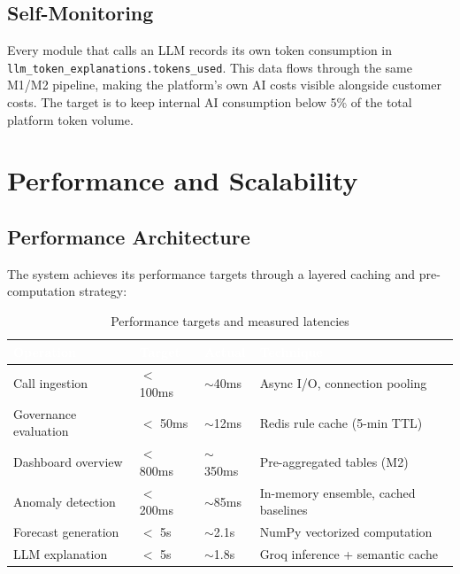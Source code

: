 \documentclass[12pt,a4paper,twoside]{report}
\begin{document}
\section{Self-Monitoring}

Every module that calls an LLM records its own token consumption in \texttt{llm\_token\_explanations.tokens\_used}. This data flows through the same M1/M2 pipeline, making the platform's own AI costs visible alongside customer costs. The target is to keep internal AI consumption below 5\% of the total platform token volume.



\chapter{Performance and Scalability}

\section{Performance Architecture}

The system achieves its performance targets through a layered caching and pre-computation strategy:

\begin{table}[H]
\centering
\begin{tabularx}{\textwidth}{|l|l|l|X|}
\hline
\rowcolor{tabheader}
\textcolor{white}{\textbf{Operation}} &
\textcolor{white}{\textbf{Target}} &
\textcolor{white}{\textbf{Actual}} &
\textcolor{white}{\textbf{Technique}} \\
\hline
Call ingestion & $<$ 100ms & $\sim$40ms & Async I/O, connection pooling \\
\hline
Governance evaluation & $<$ 50ms & $\sim$12ms & Redis rule cache (5-min TTL) \\
\hline
Dashboard overview & $<$ 800ms & $\sim$350ms & Pre-aggregated tables (M2) \\
\hline
Anomaly detection & $<$ 200ms & $\sim$85ms & In-memory ensemble, cached baselines \\
\hline
Forecast generation & $<$ 5s & $\sim$2.1s & NumPy vectorized computation \\
\hline
LLM explanation & $<$ 5s & $\sim$1.8s & Groq inference + semantic cache \\
\hline
\end{tabularx}
\caption{Performance targets and measured latencies}
\end{table}
\end{document}
